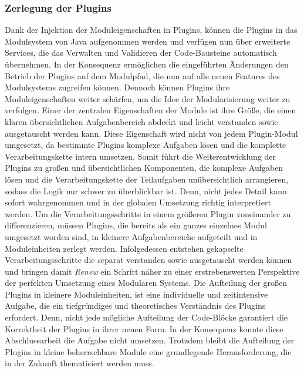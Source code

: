  \subsubsection{Zerlegung der Plugins}
	Dank der Injektion der Moduleigenschaften in Plugins, können die Plugins in das Modulsystem von Java aufgenommen werden und verfügen nun über erweiterte Services, die das Verwalten und Validieren der Code-Bausteine automatisch übernehmen. In der Konsequenz ermöglichen die eingeführten Änderungen den Betrieb der Plugins auf dem Modulpfad, die nun auf alle neuen Features des Modulsystems zugreifen können. Dennoch können Plugins ihre Moduleigenschaften weiter schärfen, um die Idee der Modularisierung weiter zu verfolgen. \newline
	Einer der zentralen Eigenschaften der Module ist ihre Größe, die einen klaren übersichtlichen Aufgabenbereich abdeckt und leicht verstanden sowie ausgetauscht werden kann. Diese Eigenschaft wird nicht von jedem Plugin-Modul umgesetzt, da bestimmte Plugins komplexe Aufgaben lösen und die komplette Verarbeitungskette intern umsetzen. Somit führt die Weiterentwicklung der Plugins zu großen und übersichtlichen Komponenten, die komplexe Aufgaben lösen und die Verarbeitungskette der Teilaufgaben unübersichtlich arrangieren, sodass die Logik nur schwer zu überblickbar ist. Denn, nicht jedes Detail kann sofort wahrgenommen und in der globalen Umsetzung richtig interpretiert werden.\newline
	Um die Verarbeitungsschritte in einem größeren Plugin voneinander zu differenzieren, müssen Plugins, die bereits als ein ganzes einzelnes Modul umgesetzt worden sind, in kleinere Aufgabenbereiche aufgeteilt und in Moduleinheiten zerlegt werden. Infolgedessen entstehen gekapselte Verarbeitungsschritte die separat verstanden sowie ausgetauscht werden können und bringen damit  \textit{Renew} ein Schritt näher zu einer erstrebenswerten Perspektive der perfekten Umsetzung eines Modularen Systems. \newline
	Die Aufteilung der großen Plugins in kleinere Moduleinheiten, ist eine individuelle und zeitintensive Aufgabe, die ein tiefgründiges und theoretisches Verständnis des Plugins erfordert. Denn, nicht jede mögliche Aufteilung der Code-Blöcke garantiert die Korrektheit der Plugins in ihrer neuen Form. \newline
	In der Konsequenz konnte diese Abschlussarbeit die Aufgabe nicht umsetzen. Trotzdem bleibt die Aufteilung der Plugins in kleine beherrschbare Module eine grundlegende Herausforderung, die in der Zukunft thematisiert werden muss. 


